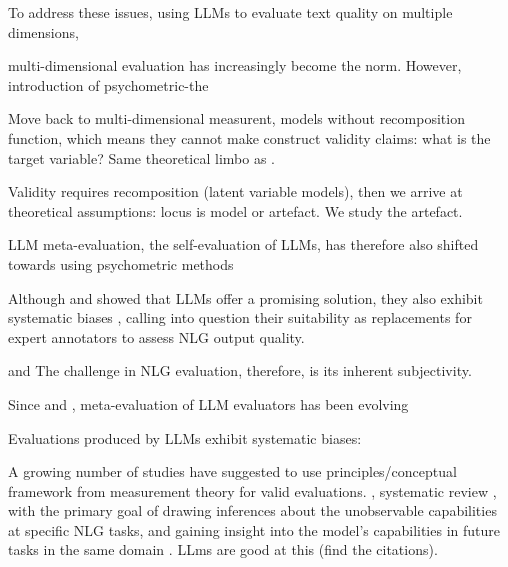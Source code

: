 To address these issues, using LLMs to evaluate text quality on multiple dimensions, 

multi-dimensional evaluation has increasingly become the norm. However, introduction of psychometric-the

Move back to multi-dimensional measurent, models without recomposition function, which means they cannot make construct validity claims: what is the target variable? Same theoretical limbo as \citet{fabbri_summeval_2021}. 

Validity requires recomposition (latent variable models), then we arrive at theoretical assumptions: locus is model or artefact. We study the artefact. 




LLM meta-evaluation, the self-evaluation of LLMs, has therefore also shifted towards using psychometric methods \citep{choiDiagnosingReliabilityLLMasaJudge2026}



Although  \citet{liu_g-eval_2023} and \citet{zheng_judging_2023} showed that LLMs offer a promising solution, they also exhibit systematic biases \citep{chehbouniNeitherValidReliable2025, shi_judging_2025, saito_verbosity_2023, stureborgLargeLanguageModels2024, panicksseryLLMEvaluatorsRecognize2024, feuerStyleOutweighsSubstance2025}, calling into question their suitability as replacements for expert annotators to assess NLG output quality.


and The challenge in NLG evaluation, therefore, is its inherent subjectivity. 

Since \citet{liu_g-eval_2023} and \citet{zheng_judging_2023}, meta-evaluation of LLM evaluators has been evolving 




Evaluations produced by LLMs exhibit systematic biases: 

A growing number of studies have suggested to use principles/conceptual framework from measurement theory for valid evaluations. 
\citep{xiaoEvaluatingEvaluationMetrics2023, binetteImprovingValidityPractical2024, beanMeasuringWhatMatters2025, salaudeenMeasurementMeaningValidityCentered2025, wangEvaluatingGeneralPurposeAI, kardanovaNovelPsychometricsBasedApproach2024, federiakinImprovingLLMLeaderboards2025, PDFModernLLM2026}, systematic review \citep{yeLargeLanguageModel2025}, with the primary goal of drawing inferences about the unobservable capabilities at specific NLG tasks, and gaining insight into the model's capabilities in future tasks in the same domain \citep{xiaoEvaluatingEvaluationMetrics2023}. 
LLms are good at this (find the citations). 



